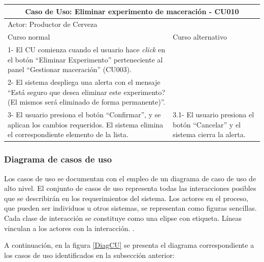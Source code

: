 \begin{longtable}{|p{7cm}|p{7cm}|}
        \hline
        \multicolumn{2}{|c|}{\textbf{Caso de Uso: Eliminar experimento de maceración - CU010}} \\
        \hline
        \multicolumn{2}{|l|}{Actor: Productor de Cerveza} \\
        \hline
        Curso normal & Curso alternativo \\
        \hline
        1- El CU comienza cuando el usuario hace \textit{click} en el botón ``Eliminar Experimento'' perteneciente al panel ``Gestionar maceración'' (CU003). & \\
        \hline
        2- El sistema despliega una alerta con el mensaje ``Está seguro que desea eliminar este experimento? (El mismos será eliminado de forma permanente)''. &
        \\
        \hline
        3- El usuario presiona el botón ``Confirmar'', y se aplican los cambios requeridos. El sistema elimina el correspondiente elemento de la lista. & 3.1- El usuario presiona el botón ``Cancelar'' y el sistema cierra la alerta.
        \\
        \hline

 \end{longtable}
    
      \subsubsection{Diagrama de casos de uso}
      \par
      Los casos de uso se documentan con el empleo de un diagrama de caso de uso de alto nivel. El conjunto de casos de uso representa todas las interacciones posibles que se describirán en los requerimientos del sistema. Los actores en el proceso, que pueden ser individuos u otros sistemas, se representan como figuras sencillas. Cada clase de interacción se constituye como una elipse con etiqueta. Líneas vinculan a los actores con la interacción. \cite{Som05}.
      \par
      A continuación, en la figura \ref{DiagCU} se presenta el diagrama correspondiente a los casos de uso identificados en la subsección anterior:\\
    
